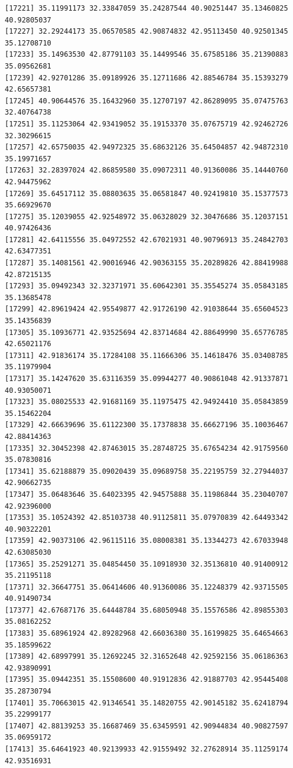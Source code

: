 \documentclass[
  letterpaper,
  DIV=11,
  numbers=noendperiod]{scrartcl}
\begin{document}
\begin{verbatim}
[17221] 35.11991173 32.33847059 35.24287544 40.90251447 35.13460825 40.92805037
[17227] 32.29244173 35.06570585 42.90874832 42.95113450 40.92501345 35.12708710
[17233] 35.14963530 42.87791103 35.14499546 35.67585186 35.21390883 35.09562681
[17239] 42.92701286 35.09189926 35.12711686 42.88546784 35.15393279 42.65657381
[17245] 40.90644576 35.16432960 35.12707197 42.86289095 35.07475763 32.40764738
[17251] 35.11253064 42.93419052 35.19153370 35.07675719 42.92462726 32.30296615
[17257] 42.65750035 42.94972325 35.68632126 35.64504857 42.94872310 35.19971657
[17263] 32.28397024 42.86859580 35.09072311 40.91360086 35.14440760 42.94475962
[17269] 35.64517112 35.08803635 35.06581847 40.92419810 35.15377573 35.66929670
[17275] 35.12039055 42.92548972 35.06328029 32.30476686 35.12037151 40.97426436
[17281] 42.64115556 35.04972552 42.67021931 40.90796913 35.24842703 42.63477351
[17287] 35.14081561 42.90016946 42.90363155 35.20289826 42.88419988 42.87215135
[17293] 35.09492343 32.32371971 35.60642301 35.35545274 35.05843185 35.13685478
[17299] 42.89619424 42.95549877 42.91726190 42.91038644 35.65604523 35.14356839
[17305] 35.10936771 42.93525694 42.83714684 42.88649990 35.65776785 42.65021176
[17311] 42.91836174 35.17284108 35.11666306 35.14618476 35.03408785 35.11979904
[17317] 35.14247620 35.63116359 35.09944277 40.90861048 42.91337871 40.93050071
[17323] 35.08025533 42.91681169 35.11975475 42.94924410 35.05843859 35.15462204
[17329] 42.66639696 35.61122300 35.17378838 35.66627196 35.10036467 42.88414363
[17335] 32.30452398 42.87463015 35.28748725 35.67654234 42.91759560 35.07830816
[17341] 35.62188879 35.09020439 35.09689758 35.22195759 32.27944037 42.90662735
[17347] 35.06483646 35.64023395 42.94575888 35.11986844 35.23040707 42.92396000
[17353] 35.10524392 42.85103738 40.91125811 35.07970839 42.64493342 40.90322201
[17359] 42.90373106 42.96115116 35.08008381 35.13344273 42.67033948 42.63085030
[17365] 35.25291271 35.04854450 35.10918930 32.35136810 40.91400912 35.21195118
[17371] 32.36647751 35.06414606 40.91360086 35.12248379 42.93715505 40.91490734
[17377] 42.67687176 35.64448784 35.68050948 35.15576586 42.89855303 35.08162252
[17383] 35.68961924 42.89282968 42.66036380 35.16199825 35.64654663 35.18599622
[17389] 42.68997991 35.12692245 32.31652648 42.92592156 35.06186363 42.93890991
[17395] 35.09442351 35.15508600 40.91912836 42.91887703 42.95445408 35.28730794
[17401] 35.70663015 42.91346541 35.14820755 42.90145182 35.62418794 35.22999177
[17407] 42.88139253 35.16687469 35.63459591 42.90944834 40.90827597 35.06959172
[17413] 35.64641923 40.92139933 42.91559492 32.27628914 35.11259174 42.93516931

\end{verbatim}
\end{document}
